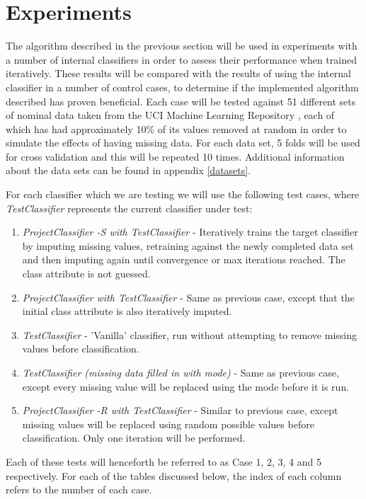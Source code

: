 \newpage
\chapter{Experiments}
The algorithm described in the previous section will be used in experiments with a number of internal classifiers in order to assess their performance when trained iteratively. These results will be compared with the results of using the internal classifier in a number of control cases, to determine if the implemented algorithm described has proven beneficial. Each case will be tested against 51 different sets of nominal data taken from the UCI Machine Learning Repository \cite{asuncion+newman:2007}, each of which has had approximately 10\% of its values removed at random in order to simulate the effects of having missing data. For each data set, 5 folds will be used for cross validation and this will be repeated 10 times. Additional information about the data sets can be found in appendix \ref{datasets}.

For each classifier which we are testing we will use the following test cases, where \textit{TestClassifier} represents the current classifier under test:

\begin{enumerate}
\item \textit{ProjectClassifier -S with TestClassifier} - Iteratively trains the target classifier by imputing missing values, retraining against the newly completed data set and then imputing again until convergence or max iterations reached. The class attribute is not guessed.
\item \textit{ProjectClassifier with TestClassifier} - Same as previous case, except that the initial class attribute is also iteratively imputed.
\item \textit{TestClassifier} - 'Vanilla' classifier, run without attempting to remove missing values before classification.
\item \textit{TestClassifier (missing data filled in with mode)} - Same as previous case, except every missing value will be replaced using the mode before it is run.
\item \textit{ProjectClassifier -R with TestClassifier} - Similar to previous case, except missing values will be replaced using random possible values before classification. Only one iteration will be performed.
\end{enumerate}

Each of these tests will henceforth be referred to as Case 1, 2, 3, 4 and 5 respectively. For each of the tables discussed below, the index of each column refers to the number of each case. 

